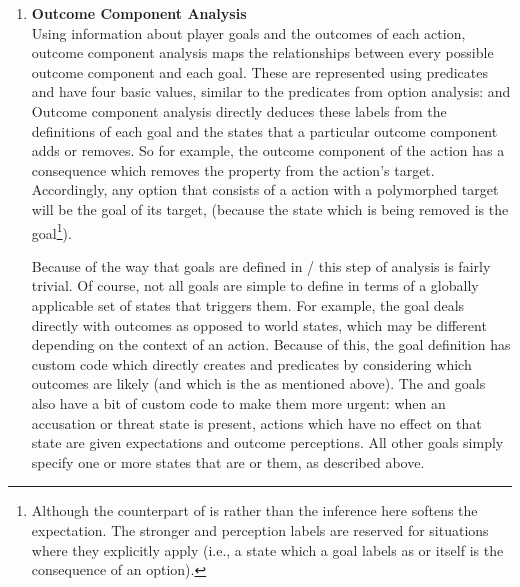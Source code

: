 \begin{enumerate}[leftmargin=1.4em]
\item %
\textbf{Outcome Component Analysis} \\
%
Using information about player goals and the outcomes of each action, outcome component analysis maps the relationships between every possible outcome component and each goal.
%
These are represented using  predicates and have four basic  values, similar to the  predicates from option analysis:    and 
%
Outcome component analysis directly deduces these labels from the definitions of each goal and the states that a particular outcome component adds or removes.
%
So for example, the  outcome component of the  action has a consequence which removes the  property from the action's target.
%
Accordingly, any option that consists of a  action with a polymorphed target will be  the  goal of its target, (because the  state which is being removed is  the  goal\footnote{%
Although the counterpart of  is  rather than  the inference here softens the expectation.
%
The stronger  and  perception labels are reserved for situations where they explicitly apply (i.e., a state which a goal labels as  or  itself is the consequence of an option).%
}).


Because of the way that goals are defined in \dunyazad/ this step of analysis is fairly trivial.
%
Of course, not all goals are simple to define in terms of a globally applicable set of states that triggers them.
%
For example, the  goal deals directly with outcomes as opposed to world states, which may be different depending on the context of an action.
%
Because of this, the  goal definition has custom code which directly creates  and  predicates by considering which outcomes are likely (and which is the  as mentioned above).
%
The  and  goals also have a bit of custom code to make them more urgent: when an accusation or threat state is present, actions which have no effect on that state are given  expectations and  outcome perceptions.
%
All other goals simply specify one or more states that are    or  them, as described above.



\end{enumerate}
